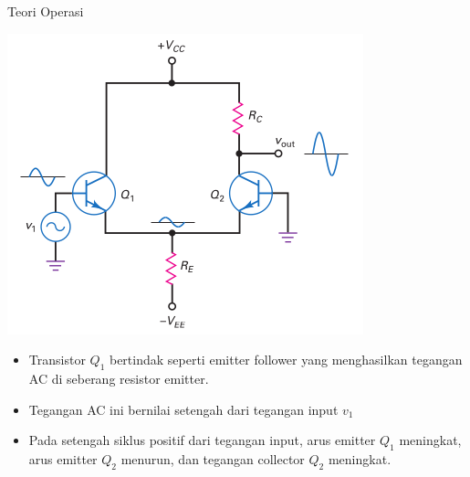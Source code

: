 \documentclass[aspectratio=169]{beamer}
\begin{document}
\begin{frame}{Teori Operasi}
	\begin{multicols}{2}
		\begin{center}
			\includegraphics[height=0.7\textheight]{gambar/01.noninverting-input+single-ended-output_AC}
		\end{center}
		\columnbreak
		\begin{itemize}
			\item Transistor $ Q_1 $ bertindak seperti emitter follower yang menghasilkan tegangan AC di seberang resistor emitter.
			\item Tegangan AC ini bernilai setengah dari tegangan input $ v_1 $
			\item Pada setengah siklus positif dari tegangan input, arus emitter $ Q_1 $ meningkat, arus emitter $ Q_2 $ menurun, dan tegangan collector $ Q_2 $ meningkat.
		\end{itemize}
	\end{multicols}
\end{frame}
\end{document}
